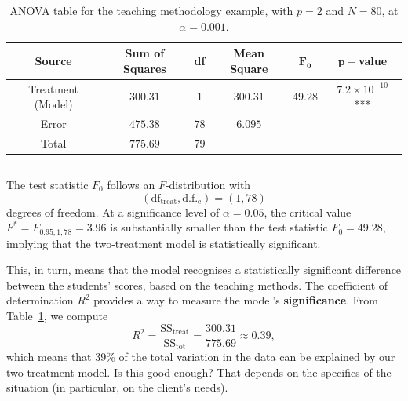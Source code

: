      \begin{table}[t]
         \centering
         \begin{tabular}{c c c c c c}
         \hline
        \textbf{Source} & \textbf{Sum of Squares} & \textbf{df} & \textbf{Mean Square} & $\mathbf{F_{0}}$ & $\mathbf{p-}$\textbf{value}\\
         \hline
         Treatment (Model) & $300.31$ & $1$ & $300.31$ & $49.28$ & $7.2\times 10^{-10}$ ***\\
         Error & $475.38$ & $78$ & $6.095$ & \\
         Total & $775.69$ & $79$ & & \\
        \hline
         \end{tabular}
         \caption[\small ANOVA table -- teaching methodology]{\small ANOVA table for the teaching methodology example, with $p=2$ and $N=80$, at $\alpha=0.001$.}
         \label{tab:SA3}\hrule
     \end{table}
The test statistic $F_{0}$ follows an $F$-distribution with $$(\text{df}_{\textrm{treat}}, \text{d.f.}_{\textrm{e}})=(1,78)$$ degrees of freedom. At a significance level of $\alpha=0.05$, the critical value $F^*=F_{0.95, 1, 78}=3.96$ is substantially smaller than the test statistic $F_{0}=49.28$, implying that the two-treatment model is statistically significant. \par This, in turn, means that the model recognises a statistically significant difference between the students' scores, based on the teaching methods. 
\newl The coefficient of determination $R^2$ provides a way to measure the model's \textbf{significance}. From Table~\ref{tab:SA3}, we compute $$R^{2}=\frac{\text{SS}_{\textrm{treat}}}{\text{SS}_{\textrm{tot}}}=\frac{300.31}{775.69}\approx 0.39,$$ which means that $39\%$ of the total variation in the data can be explained by our two-treatment model. Is this good enough? That depends on the specifics of the situation (in particular, on the client's needs).

